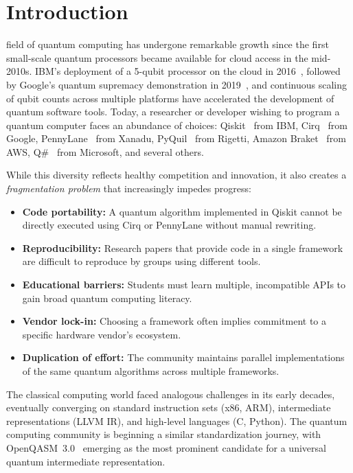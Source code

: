\documentclass[journal]{IEEEtran}
\begin{document}
\section{Introduction}
\label{sec:introduction}

 field of quantum computing has undergone remarkable growth since the first small-scale quantum processors became available for cloud access in the mid-2010s. IBM's deployment of a 5-qubit processor on the cloud in 2016~\cite{ibmquantum}, followed by Google's quantum supremacy demonstration in 2019~\cite{arute2019quantum}, and continuous scaling of qubit counts across multiple platforms have accelerated the development of quantum software tools. Today, a researcher or developer wishing to program a quantum computer faces an abundance of choices: Qiskit~\cite{qiskit2024} from IBM, Cirq~\cite{cirq2024} from Google, PennyLane~\cite{pennylane2024} from Xanadu, PyQuil~\cite{smith2016practical} from Rigetti, Amazon Braket~\cite{braket2024} from AWS, Q\#~\cite{svore2018q} from Microsoft, and several others.

While this diversity reflects healthy competition and innovation, it also creates a \emph{fragmentation problem} that increasingly impedes progress:

\begin{itemize}
    \item \textbf{Code portability:} A quantum algorithm implemented in Qiskit cannot be directly executed using Cirq or PennyLane without manual rewriting.
    \item \textbf{Reproducibility:} Research papers that provide code in a single framework are difficult to reproduce by groups using different tools.
    \item \textbf{Educational barriers:} Students must learn multiple, incompatible APIs to gain broad quantum computing literacy.
    \item \textbf{Vendor lock-in:} Choosing a framework often implies commitment to a specific hardware vendor's ecosystem.
    \item \textbf{Duplication of effort:} The community maintains parallel implementations of the same quantum algorithms across multiple frameworks.
\end{itemize}

The classical computing world faced analogous challenges in its early decades, eventually converging on standard instruction sets (x86, ARM), intermediate representations (LLVM IR), and high-level languages (C, Python). The quantum computing community is beginning a similar standardization journey, with OpenQASM~3.0~\cite{cross2022openqasm} emerging as the most prominent candidate for a universal quantum intermediate representation.
\end{document}
